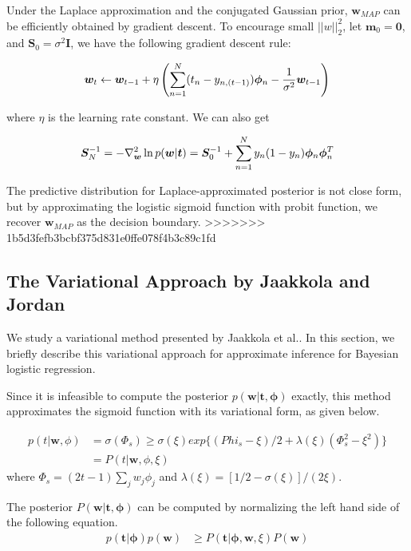 Under the Laplace approximation and the conjugated Gaussian prior, $\bm{w}_{MAP}$
can be efficiently obtained by gradient descent. To encourage small
$||w||^2_2$, let $\bm{m}_0 = \bm{0}$, and $\bm{S}_0 = \sigma^2 \bm{I}$, we
have the following gradient descent rule: 

\begin{equation}
\bm{w}_t \leftarrow \bm{w}_{t-1} + \eta\left( \sum_{n=1}^N (t_n - y_{n,(t-1)}) \bm{\phi}_n -
\frac{1}{\sigma^2}\bm{w}_{t-1} \right)
\end{equation}

where $\eta$ is the learning rate constant. We can also get

\begin{equation}
\bm{S}_N^{-1} = -\nabla^2_{\bm{w}} \ln p(\bm{w}|\bm{t})
= \bm{S}_0^{-1} + \sum_{n=1}^N y_n(1-y_n) \bm{\phi}_n \bm{\phi}_n^T
\end{equation}

The predictive distribution for Laplace-approximated posterior is not close
form, but by approximating the logistic sigmoid function with probit function,
we recover $\bm{w}_{MAP}$ as the decision boundary.
>>>>>>> 1b5d3fefb3bcbf375d831e0ffe078f4b3c89c1fd

\subsection{The Variational Approach by Jaakkola and Jordan}
We study a variational method presented by Jaakkola et al.\cite{Jaakkola96avariational}. In this section, we briefly describe this variational approach for approximate inference for Bayesian logistic regression. 

Since it is infeasible to compute the posterior $p(\bm{w} | \bm{t}, \bm{\phi})$ exactly, this method approximates the sigmoid function with its variational form, as given below.

\begin{align}
  p(t | \bm{w}, \phi) &= \sigma(\Phi_s) \geq \sigma(\xi) exp\{(Phi_s - \xi)/2 + \lambda(\xi)(\Phi_s^2 - \xi^2)\} \\
  &= P(t | \bm{w}, \phi, \xi)
\end{align}
where $\Phi_s = (2t - 1)\sum_jw_j\phi_j$ and $\lambda(\xi) = [1/2 - \sigma(\xi)]/(2\xi)$.

The posterior $P(\bm{w}|\bm{t}, \bm{\phi})$ can be computed by normalizing the left hand side of the following equation.
\begin{align}
\label{eq:variational}
p(\bm{t}|\bm{\phi})p(\bm{w}) &\geq P(\bm{t}|\bm{\phi}, \bm{w}, \xi)P(\bm{w})
\end{align}

